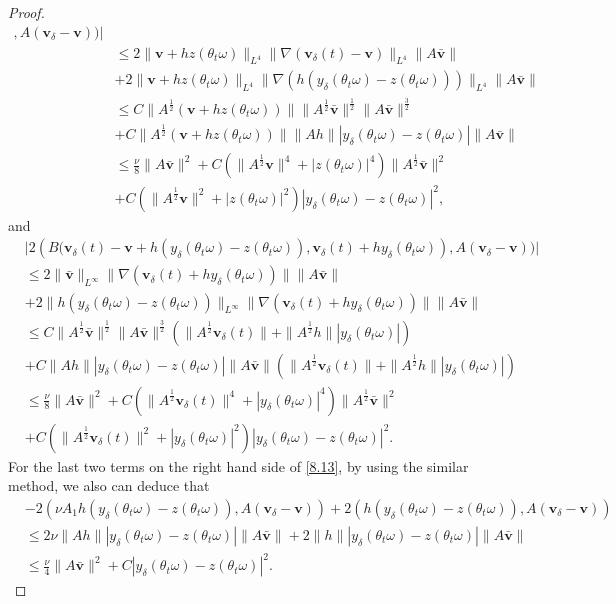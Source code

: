 \documentclass{elsarticle}
\theoremstyle{definition}
\numberwithin{equation}{section}
\begin{document}
\begin{proof}
\begin{align}
,A(\textbf{v}_\delta-\textbf{v})\big)\big|\nonumber\\
 &\leq 2\|\textbf{v}+hz(\theta_t\omega)\|_{L^4}\|\nabla(\textbf{v}_\delta(t)-\textbf{v})\|_{L^4}\|A\bar{\textbf{v}}\|\nonumber\\
& +2\|\textbf{v}+hz(\theta_t\omega)\|_{L^4}\|\nabla(h(y_\delta(\theta_t\omega)-z(\theta_t\omega)))\|_{L^4}\|A\bar{\textbf{v}}\|
\nonumber\\
&\leq C\|A^\frac12(\textbf{v}+hz(\theta_t\omega))\|\|A^\frac12\bar{\textbf{v}}\|^\frac12\|A\bar{\textbf{v}}\|^\frac32\nonumber\\
& +C\|A^\frac12(\textbf{v}+hz(\theta_t\omega))\|\|Ah\||y_\delta(\theta_t\omega)-z(\theta_t\omega)|\|A\bar{\textbf{v}}\|\nonumber\\
&\leq\frac{\nu}{8}\|A\bar{\textbf{v}}\|^2+C(\|A^\frac12\textbf{v}\|^4+|z(\theta_t\omega)|^4)\|A^\frac12\bar{\textbf{v}}\|^2
\nonumber\\
& +C(\|A^\frac12\textbf{v}\|^2+|z(\theta_t\omega)|^2)|y_\delta(\theta_t\omega)-z(\theta_t\omega)|^2,
\end{align}
and
\begin{align}
 &\big|2(B\big( \textbf{v}_\delta(t)-\textbf{v}+h(y_\delta(\theta_t\omega)-z(\theta_t\omega)),\textbf{v}_\delta(t)+hy_\delta(\theta_t\omega))
,A(\textbf{v}_\delta-\textbf{v})\big)\big| \nonumber\\
&\leq 2\|\bar{\textbf{v}}\|_{L^\infty}\|\nabla(\textbf{v}_\delta(t)+hy_\delta(\theta_t\omega))\|\|A\bar{\textbf{v}}\|\nonumber\\
&+2\|h(y_\delta(\theta_t\omega)-z(\theta_t\omega))\|_{L^\infty}\|\nabla(\textbf{v}_\delta(t)+hy_\delta(\theta_t\omega))\|
\|A\bar{\textbf{v}}\|\nonumber\\
&\leq C\|A^\frac12\bar{\textbf{v}}\|^\frac12\|A\bar{\textbf{v}}\|^\frac32(\|A^\frac12\textbf{v}_\delta(t)\|+\|A^\frac12h\|
|y_\delta(\theta_t\omega)|)\nonumber\\
&+C\|Ah\||y_\delta(\theta_t\omega)-z(\theta_t\omega)|\|A\bar{\textbf{v}}\|(\|A^\frac12\textbf{v}_\delta(t)\|+\|A^\frac12h\|
|y_\delta(\theta_t\omega)|)
\nonumber\\
&\leq \frac{\nu}{8}\|A\bar{\textbf{v}}\|^2+C(\|A^\frac12\textbf{v}_\delta(t)\|^4+|y_\delta(\theta_t\omega)|^4)
\|A^\frac12\bar{\textbf{v}}\|^2
\nonumber\\
& +C(\|A^\frac12\textbf{v}_\delta(t)\|^2+
|y_\delta(\theta_t\omega)|^2)|y_\delta(\theta_t\omega)-z(\theta_t\omega)|^2.
\end{align}
For the last two terms on the right hand side of \eqref{8.13}, by using the similar method, we also can deduce that
\begin{align}\label{8.15}
&-  2(\nu A_1h(y_\delta(\theta_t\omega)-z(\theta_t\omega)),A(\textbf{v}_\delta-\textbf{v}))
+2(h(y_\delta (\theta_t\omega)-z(\theta_t\omega)),A(\textbf{v}_\delta-\textbf{v}))\nonumber\\
&\leq 2\nu\|Ah\||y_\delta(\theta_t\omega)-z(\theta_t\omega)|\|A\bar{\textbf{v}}\|
+2\|h\||y_\delta(\theta_t\omega)-z(\theta_t\omega)|\|A\bar{\textbf{v}}\|
\nonumber\\
&\leq \frac{\nu}{4}\|A\bar{\textbf{v}}\|^2+C|y_\delta(\theta_t\omega)-z(\theta_t\omega)|^2.
\end{align}



\end{proof}
\end{document}
